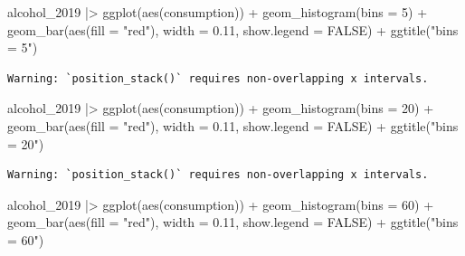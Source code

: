 \documentclass[
  letterpaper,
]{krantz}
\makeatletter
\newenvironment{Shaded}{\begin{snugshade}}{\end{snugshade}}
\newcommand{\AttributeTok}[1]{\textcolor[rgb]{0.40,0.45,0.13}{#1}}
\newcommand{\ConstantTok}[1]{\textcolor[rgb]{0.56,0.35,0.01}{#1}}
\newcommand{\DecValTok}[1]{\textcolor[rgb]{0.68,0.00,0.00}{#1}}
\newcommand{\FloatTok}[1]{\textcolor[rgb]{0.68,0.00,0.00}{#1}}
\newcommand{\FunctionTok}[1]{\textcolor[rgb]{0.28,0.35,0.67}{#1}}
\newcommand{\NormalTok}[1]{\textcolor[rgb]{0.00,0.23,0.31}{#1}}
\newcommand{\SpecialCharTok}[1]{\textcolor[rgb]{0.37,0.37,0.37}{#1}}
\newcommand{\StringTok}[1]{\textcolor[rgb]{0.13,0.47,0.30}{#1}}
\newenvironment{kframe}{%
\medskip{}
\setlength{\fboxsep}{.8em}
 \def\at@end@of@kframe{}%
 \ifinner\ifhmode%
  \def\at@end@of@kframe{\end{minipage}}%
  \begin{minipage}{\columnwidth}%
 \fi\fi%
 \def\FrameCommand##1{\hskip\@totalleftmargin \hskip-\fboxsep
 \colorbox{shadecolor}{##1}\hskip-\fboxsep
     \hskip-\linewidth \hskip-\@totalleftmargin \hskip\columnwidth}%
 \MakeFramed {\advance\hsize-\width
   \@totalleftmargin\z@ \linewidth\hsize
   \@setminipage}}%
 {\par\unskip\endMakeFramed%
 \at@end@of@kframe}
\renewenvironment{Shaded}{\begin{kframe}}{\end{kframe}}
\makeatother
\begin{document}
\begin{Shaded}
\begin{Highlighting}[]
\NormalTok{  alcohol\_2019 }\SpecialCharTok{|\textgreater{}}
  \FunctionTok{ggplot}\NormalTok{(}\FunctionTok{aes}\NormalTok{(consumption)) }\SpecialCharTok{+}
  \FunctionTok{geom\_histogram}\NormalTok{(}\AttributeTok{bins =} \DecValTok{5}\NormalTok{) }\SpecialCharTok{+}
  \FunctionTok{geom\_bar}\NormalTok{(}\FunctionTok{aes}\NormalTok{(}\AttributeTok{fill =} \StringTok{"red"}\NormalTok{), }\AttributeTok{width =} \FloatTok{0.11}\NormalTok{, }\AttributeTok{show.legend =} \ConstantTok{FALSE}\NormalTok{) }\SpecialCharTok{+}
  \FunctionTok{ggtitle}\NormalTok{(}\StringTok{"bins = 5"}\NormalTok{)}
\end{Highlighting}
\end{Shaded}

\begin{verbatim}
Warning: `position_stack()` requires non-overlapping x intervals.
\end{verbatim}

\begin{Shaded}
\begin{Highlighting}[]
\NormalTok{  alcohol\_2019 }\SpecialCharTok{|\textgreater{}}
  \FunctionTok{ggplot}\NormalTok{(}\FunctionTok{aes}\NormalTok{(consumption)) }\SpecialCharTok{+}
  \FunctionTok{geom\_histogram}\NormalTok{(}\AttributeTok{bins =} \DecValTok{20}\NormalTok{) }\SpecialCharTok{+}
  \FunctionTok{geom\_bar}\NormalTok{(}\FunctionTok{aes}\NormalTok{(}\AttributeTok{fill =} \StringTok{"red"}\NormalTok{), }\AttributeTok{width =} \FloatTok{0.11}\NormalTok{, }\AttributeTok{show.legend =} \ConstantTok{FALSE}\NormalTok{) }\SpecialCharTok{+}
  \FunctionTok{ggtitle}\NormalTok{(}\StringTok{"bins = 20"}\NormalTok{)}
\end{Highlighting}
\end{Shaded}

\begin{verbatim}
Warning: `position_stack()` requires non-overlapping x intervals.
\end{verbatim}

\begin{Shaded}
\begin{Highlighting}[]
\NormalTok{  alcohol\_2019 }\SpecialCharTok{|\textgreater{}}
  \FunctionTok{ggplot}\NormalTok{(}\FunctionTok{aes}\NormalTok{(consumption)) }\SpecialCharTok{+}
  \FunctionTok{geom\_histogram}\NormalTok{(}\AttributeTok{bins =} \DecValTok{60}\NormalTok{) }\SpecialCharTok{+}
  \FunctionTok{geom\_bar}\NormalTok{(}\FunctionTok{aes}\NormalTok{(}\AttributeTok{fill =} \StringTok{"red"}\NormalTok{), }\AttributeTok{width =} \FloatTok{0.11}\NormalTok{, }\AttributeTok{show.legend =} \ConstantTok{FALSE}\NormalTok{) }\SpecialCharTok{+}
  \FunctionTok{ggtitle}\NormalTok{(}\StringTok{"bins = 60"}\NormalTok{)}
\end{Highlighting}
\end{Shaded}
\end{document}
